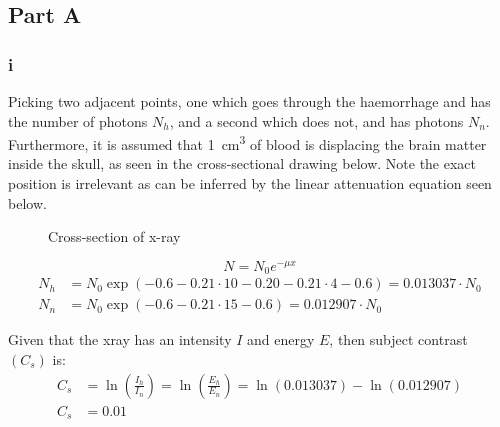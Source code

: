 \subsection*{Part A}
    \subsubsection*{i}
    Picking two adjacent points, one which goes through the haemorrhage and has the number of photons $N_h$, and a second which does not, and has photons $N_n$. Furthermore, it is assumed that \SI{1}{cm^3} of blood is displacing the brain matter inside the skull, as seen in the cross-sectional drawing below. Note the exact position is irrelevant as can be inferred by the linear attenuation equation seen below.

    \begin{figure}[h!]
        \centering
        \caption{Cross-section of x-ray}
    \end{figure}
    \begin{equation*}
        N = N_0 e^{-\mu x}
    \end{equation*}
    \begin{equation*}
        \begin{split}
            N_{h} &= N_0 \exp({ -0.6 - 0.21\cdot 10 - 0.20 - 0.21 \cdot 4 - 0.6}) = 0.013037 \cdot N_0 \\
            N_{n} &= N_0 \exp({ -0.6 - 0.21 \cdot 15 - 0.6 }) = 0.012907 \cdot N_0 
        \end{split}
    \end{equation*}

    Given that the xray has an intensity $I$ and energy $E$, then subject contrast $(C_s)$ is:
    \begin{equation}\begin{split}
        C_s &= \ln \left({\frac{I_h}{I_n}}\right) = \ln\left({ \frac{E_h }{E_n} }\right) = \ln (0.013037) - \ln(0.012907)\\
        C_s &= 0.01
    \end{split}
    \end{equation}

